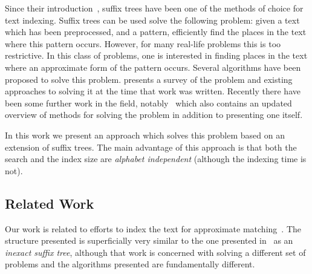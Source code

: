 Since their introduction~\cite{DBLP:conf/focs/Weiner73}, suffix trees have been one of the methods of choice for text indexing. Suffix trees can be used solve the following problem: given a text which has been preprocessed, and a pattern, efficiently find the places in the text where this pattern occurs.  However, for many real-life problems this is too restrictive. In this class of problems, one is interested in finding places in the text where an approximate form of the pattern occurs. Several algorithms have been proposed to solve this problem. \cite{navarro:guided} presents a survey of the problem and existing approaches to solving it at the time that work was written. Recently there have been some further work in the field, notably~\cite{maass:text} which also contains an updated overview of methods for solving the problem in addition to presenting one itself.

In this work we present an approach which solves this problem based on an extension of suffix trees. The main advantage of this approach is that both the search and the index size are \emph{alphabet independent} (although the indexing time is not).

\subsection{Related Work}

Our work is related to efforts to index the text for approximate matching~\cite{maass:text,amir00oneerror}. The structure presented is superficially very similar to the one presented in~\cite{DBLP:journals/tcs/ChattarajP05} as an \textit{inexact suffix tree}, although that work is concerned with solving a different set of problems and the algorithms presented are fundamentally different.
